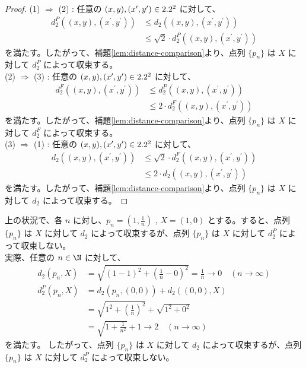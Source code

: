 \documentclass[article,paper=a4paper]{jlreq}
\begin{document}
\begin{proof}
    (1) $\Rightarrow$ (2) : 任意の $(x,y), (x^{\prime},y^{\prime}) \in 2.2^2$ に対して、
    \begin{align*}
        d_2^P((x,y),(x^{\prime},y^{\prime})) &\leq d_2((x,y),(x^{\prime},y^{\prime})) \\
        &\leq \sqrt{2}\cdot d_2^P((x,y),(x^{\prime},y^{\prime}))
    \end{align*}
    を満たす。したがって、補題\ref{lem:distance-comparison}より、点列 $\{p_n\}$ は $X$ に対して $d_2^P$ によって収束する。\\
    
    (2) $\Rightarrow$ (3) : 任意の $(x,y), (x^{\prime},y^{\prime}) \in 2.2^2$ に対して、
    \begin{align*}
        d_{2}^{F}((x,y),(x^{\prime},y^{\prime})) &\leq d_2^P((x,y),(x^{\prime},y^{\prime})) \\
        &\leq 2\cdot d_{2}^{F}((x,y),(x^{\prime},y^{\prime}))
    \end{align*}
    を満たす。したがって、補題\ref{lem:distance-comparison}より、点列 $\{p_n\}$ は $X$ に対して $d_{2}^{F}$ によって収束する。\\
    
    (3) $\Rightarrow$ (1) : 任意の $(x,y), (x^{\prime},y^{\prime}) \in 2.2^2$ に対して、
    \begin{align*}
        d_2((x,y),(x^{\prime},y^{\prime})) &\leq \sqrt{2}\cdot d_{2}^{F}((x,y),(x^{\prime},y^{\prime})) \\
        &\leq 2\cdot d_2((x,y),(x^{\prime},y^{\prime}))
    \end{align*}
    を満たす。したがって、補題\ref{lem:distance-comparison}より、点列 $\{p_n\}$ は $X$ に対して $d_2$ によって収束する。
\end{proof}

\begin{ex}
    上の状況で、各 $n$ に対し、$p_n = \left(1, \frac{1}{n}\right)$ , $X = (1,0)$ とする。すると、点列 $\{p_n\}$ は $X$ に対して $d_2$ によって収束するが、点列 $\{p_n\}$ は $X$ に対して $d_{2}^{P}$ によって収束しない。\\

    実際、任意の $n \in \N$ に対して、
    \begin{align*}
        d_2(p_n,X) &= \sqrt{\left(1 - 1\right)^2 + \left(\frac{1}{n} - 0\right)^2} = \frac{1}{n} \to 0 \quad (n \to \infty) \\
        d_2^P(p_n,X) &=
        d_2(p_n, (0,0)) + d_2((0,0),X) \\
        &= \sqrt{1^2 + \left(\frac{1}{n}\right)^2} + \sqrt{1^2 + 0^2} \\
        &= \sqrt{1 + \frac{1}{n^2}} + 1 \to 2 \quad (n \to \infty)
    \end{align*}   
    を満たす。 したがって、点列 $\{p_n\}$ は $X$ に対して $d_2$ によって収束するが、点列 $\{p_n\}$ は $X$ に対して $d_{2}^{P}$ によって収束しない。
\end{ex}
\end{document}
